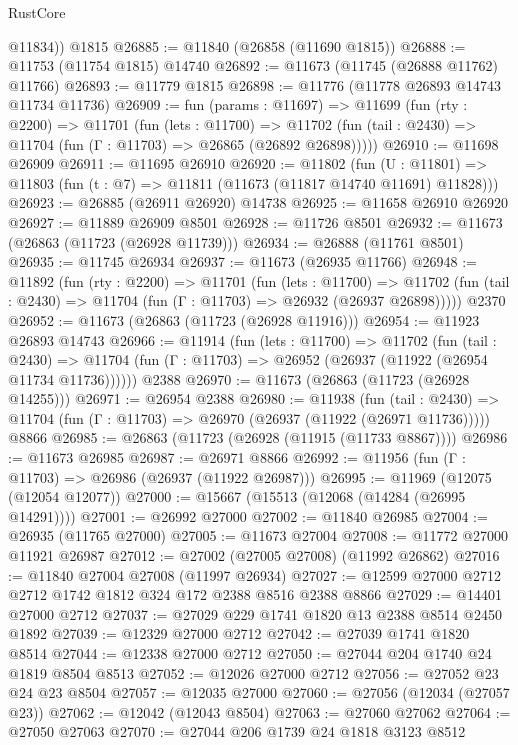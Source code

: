 \begin{lexlean}{RustCore}
\begin{coremodule}
        @11834))
    @1815
@26885 := @11840 (@26858 (@11690 @1815))
@26888 := @11753 (@11754 @1815) @14740
@26892 := @11673 (@11745 (@26888 @11762) @11766)
@26893 := @11779 @1815
@26898 := @11776 (@11778 @26893 @14743 @11734 @11736)
@26909 := fun (params : @11697) =>
  @11699
    (fun (rty : @2200) =>
    @11701
      (fun (lets : @11700) =>
      @11702 (fun (tail : @2430) => @11704 (fun (Γ : @11703) => @26865 (@26892 @26898)))))
@26910 := @11698 @26909
@26911 := @11695 @26910
@26920 := @11802
    (fun (U : @11801) => @11803 (fun (t : @7) => @11811 (@11673 (@11817 @14740 @11691) @11828)))
@26923 := @26885 (@26911 @26920) @14738
@26925 := @11658 @26910 @26920
@26927 := @11889 @26909 @8501
@26928 := @11726 @8501
@26932 := @11673 (@26863 (@11723 (@26928 @11739)))
@26934 := @26888 (@11761 @8501)
@26935 := @11745 @26934
@26937 := @11673 (@26935 @11766)
@26948 := @11892
    (fun (rty : @2200) =>
    @11701
      (fun (lets : @11700) =>
      @11702 (fun (tail : @2430) => @11704 (fun (Γ : @11703) => @26932 (@26937 @26898)))))
    @2370
@26952 := @11673 (@26863 (@11723 (@26928 @11916)))
@26954 := @11923 @26893 @14743
@26966 := @11914
    (fun (lets : @11700) =>
    @11702
      (fun (tail : @2430) =>
      @11704 (fun (Γ : @11703) => @26952 (@26937 (@11922 (@26954 @11734 @11736))))))
    @2388
@26970 := @11673 (@26863 (@11723 (@26928 @14255)))
@26971 := @26954 @2388
@26980 := @11938
    (fun (tail : @2430) => @11704 (fun (Γ : @11703) => @26970 (@26937 (@11922 (@26971 @11736)))))
    @8866
@26985 := @26863 (@11723 (@26928 (@11915 (@11733 @8867))))
@26986 := @11673 @26985
@26987 := @26971 @8866
@26992 := @11956 (fun (Γ : @11703) => @26986 (@26937 (@11922 @26987)))
@26995 := @11969 (@12075 (@12054 @12077))
@27000 := @15667 (@15513 (@12068 (@14284 (@26995 @14291))))
@27001 := @26992 @27000
@27002 := @11840 @26985
@27004 := @26935 (@11765 @27000)
@27005 := @11673 @27004
@27008 := @11772 @27000 @11921 @26987
@27012 := @27002 (@27005 @27008) (@11992 @26862)
@27016 := @11840 @27004 @27008 (@11997 @26934)
@27027 := @12599 @27000 @2712 @2712 @1742 @1812 @324 @172 @2388 @8516 @2388 @8866
@27029 := @14401 @27000 @2712
@27037 := @27029 @229 @1741 @1820 @13 @2388 @8514 @2450 @1892
@27039 := @12329 @27000 @2712
@27042 := @27039 @1741 @1820 @8514
@27044 := @12338 @27000 @2712
@27050 := @27044 @204 @1740 @24 @1819 @8504 @8513
@27052 := @12026 @27000 @2712
@27056 := @27052 @23 @24 @23 @8504
@27057 := @12035 @27000
@27060 := @27056 (@12034 (@27057 @23))
@27062 := @12042 (@12043 @8504)
@27063 := @27060 @27062
@27064 := @27050 @27063
@27070 := @27044 @206 @1739 @24 @1818 @3123 @8512

\end{coremodule}
\end{lexlean}
